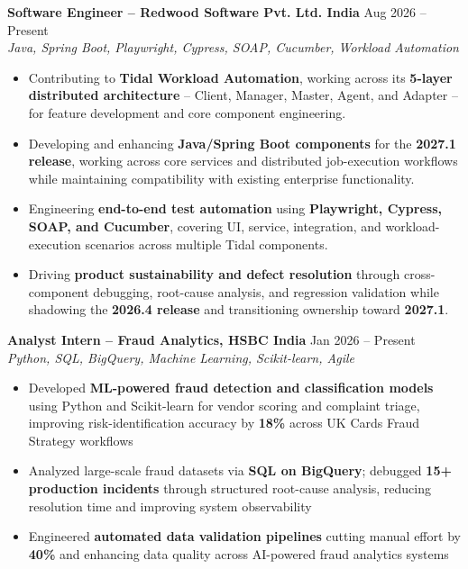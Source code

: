 \documentclass[10.5pt]{article}
\begin{document}
\textbf{Software Engineer -- Redwood Software Pvt. Ltd. India} \hfill Aug 2026 -- Present \\
\textit{Java, Spring Boot, Playwright, Cypress, SOAP, Cucumber, Workload Automation}
\begin{itemize}
  \item Contributing to \textbf{Tidal Workload Automation}, working across its \textbf{5-layer distributed architecture} -- Client, Manager, Master, Agent, and Adapter -- for feature development and core component engineering.
  \item Developing and enhancing \textbf{Java/Spring Boot components} for the \textbf{2027.1 release}, working across core services and distributed job-execution workflows while maintaining compatibility with existing enterprise functionality.
  \item Engineering \textbf{end-to-end test automation} using \textbf{Playwright, Cypress, SOAP, and Cucumber}, covering UI, service, integration, and workload-execution scenarios across multiple Tidal components.
  \item Driving \textbf{product sustainability and defect resolution} through cross-component debugging, root-cause analysis, and regression validation while shadowing the \textbf{2026.4 release} and transitioning ownership toward \textbf{2027.1}.
\end{itemize}

\vspace{-2pt}
\textbf{Analyst Intern -- Fraud Analytics, HSBC India} \hfill Jan 2026 -- Present \\
\textit{Python, SQL, BigQuery, Machine Learning, Scikit-learn, Agile}
\begin{itemize}
  \item Developed \textbf{ML-powered fraud detection and classification models} using Python and
        Scikit-learn for vendor scoring and complaint triage, improving risk-identification
        accuracy by \textbf{18\%} across UK Cards Fraud Strategy workflows
  \item Analyzed large-scale fraud datasets via \textbf{SQL on BigQuery}; debugged \textbf{15+
        production incidents} through structured root-cause analysis, reducing resolution
        time and improving system observability
  \item Engineered \textbf{automated data validation pipelines} cutting manual effort by
        \textbf{40\%} and enhancing data quality across AI-powered fraud analytics systems
\end{itemize}
\end{document}
